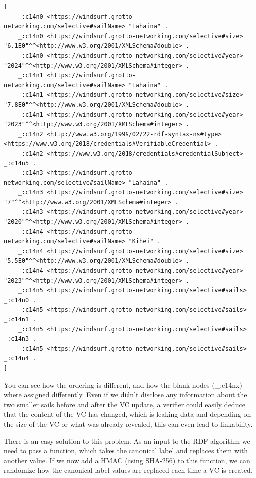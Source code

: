\documentclass[
	a4paper               %
	,bibliography=totoc   %
	,listof=totoc         %
	,monolingual
	twoside=false,
]{bfhthesis}              %
\begin{document}
\begin{lstlisting}[language=canon,firstnumber=1,caption={Example: Updated sails VC as statements},captionpos=b]
[
	_:c14n0 <https://windsurf.grotto-networking.com/selective#sailName> "Lahaina" .
	_:c14n0 <https://windsurf.grotto-networking.com/selective#size> "6.1E0"^^<http://www.w3.org/2001/XMLSchema#double> .
	_:c14n0 <https://windsurf.grotto-networking.com/selective#year> "2024"^^<http://www.w3.org/2001/XMLSchema#integer> .
	_:c14n1 <https://windsurf.grotto-networking.com/selective#sailName> "Lahaina" .
	_:c14n1 <https://windsurf.grotto-networking.com/selective#size> "7.8E0"^^<http://www.w3.org/2001/XMLSchema#double> .
	_:c14n1 <https://windsurf.grotto-networking.com/selective#year> "2023"^^<http://www.w3.org/2001/XMLSchema#integer> .
	_:c14n2 <http://www.w3.org/1999/02/22-rdf-syntax-ns#type> <https://www.w3.org/2018/credentials#VerifiableCredential> .
	_:c14n2 <https://www.w3.org/2018/credentials#credentialSubject> _:c14n5 .
	_:c14n3 <https://windsurf.grotto-networking.com/selective#sailName> "Lahaina" .
	_:c14n3 <https://windsurf.grotto-networking.com/selective#size> "7"^^<http://www.w3.org/2001/XMLSchema#integer> .
	_:c14n3 <https://windsurf.grotto-networking.com/selective#year> "2020"^^<http://www.w3.org/2001/XMLSchema#integer> .
	_:c14n4 <https://windsurf.grotto-networking.com/selective#sailName> "Kihei" .
	_:c14n4 <https://windsurf.grotto-networking.com/selective#size> "5.5E0"^^<http://www.w3.org/2001/XMLSchema#double> .
	_:c14n4 <https://windsurf.grotto-networking.com/selective#year> "2023"^^<http://www.w3.org/2001/XMLSchema#integer> .
	_:c14n5 <https://windsurf.grotto-networking.com/selective#sails> _:c14n0 .
	_:c14n5 <https://windsurf.grotto-networking.com/selective#sails> _:c14n1 .
	_:c14n5 <https://windsurf.grotto-networking.com/selective#sails> _:c14n3 .
	_:c14n5 <https://windsurf.grotto-networking.com/selective#sails> _:c14n4 .
]
\end{lstlisting}

You can see how the ordering is different, and how the blank nodes (\_:c14nx) where assigned differently.
Even if we didn't disclose any information about the two smaller sails before and after the VC update, a verifier could easily deduce that the content of the VC has changed, which is leaking data and depending on the size of the VC or what was already revealed, this can even lead to linkability.

There is an easy solution to this problem.
As an input to the RDF algorithm we need to pass a function, which takes the canonical label and replaces them with another value.
If we now add a HMAC (using SHA-256) to this function, we can randomize how the canonical label values are replaced each time a VC is created.
\end{document}
